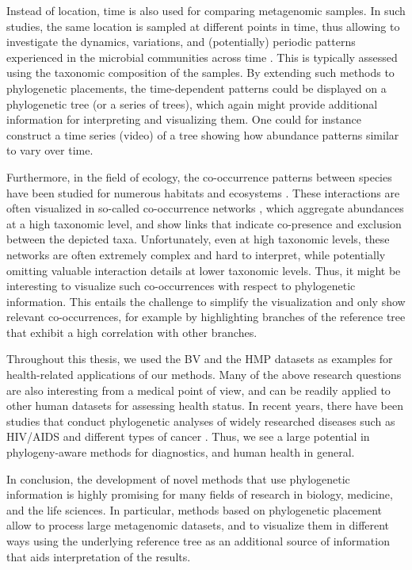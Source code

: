 Instead of location, time is also used for comparing metagenomic samples.
In such studies, the same location is sampled at different points in time,
thus allowing to investigate the dynamics, variations, and (potentially) periodic patterns
experienced in the microbial communities across time \cite{Costello2009,Faust2015}.
This is typically assessed using the taxonomic composition of the samples.
By extending such methods to phylogenetic placements,
the time-dependent patterns could be displayed on a phylogenetic tree (or a series of trees),
which again might provide additional information for interpreting and visualizing them.
One could for instance construct a time series (video) of a tree showing
how abundance patterns similar to  vary over time.

Furthermore, in the field of ecology, the co-occurrence patterns between species
have been studied for numerous habitats and ecosystems \cite{Lima-Mendez2015,Villalobos2017,Zelezniak2015}.
These interactions are often visualized in so-called co-occurrence networks \cite{Chaffron2010,Faust2012},
which aggregate abundances at a high taxonomic level,
and show links that indicate co-presence and exclusion between the depicted taxa.
Unfortunately, even at high taxonomic levels, these networks are often extremely complex and hard to interpret,
while potentially omitting valuable interaction details at lower taxonomic levels.
Thus, it might be interesting to visualize such co-occurrences with respect to phylogenetic information.
This entails the challenge to simplify the visualization and only show relevant co-occurrences,
for example by highlighting branches of the reference tree that exhibit a high correlation with other branches.

Throughout this thesis, we used the \acf{BV} \cite{Srinivasan2012} and the \acf{HMP} \cite{Huttenhower2012,Methe2012}
datasets as examples for health-related applications of our methods.
Many of the above research questions are also interesting from a medical point of view,
and can be readily applied to other human datasets for assessing health status.
In recent years, there have been studies that conduct phylogenetic analyses of widely researched diseases
such as HIV/AIDS \cite{Castro-Nallar2012,Brenner2013,Ratmann2017} and different types of cancer \cite{Brown2017a,Abbosh2017}.
Thus, we see a large potential in phylogeny-aware methods for diagnostics, and human health in general.

In conclusion, the development of novel methods that use phylogenetic information
is highly promising for many fields of research in biology, medicine, and the life sciences.
In particular, methods based on phylogenetic placement allow to process large metagenomic datasets,
and to visualize them in different ways using the underlying reference tree as an additional source
of information that aids interpretation of the results.
